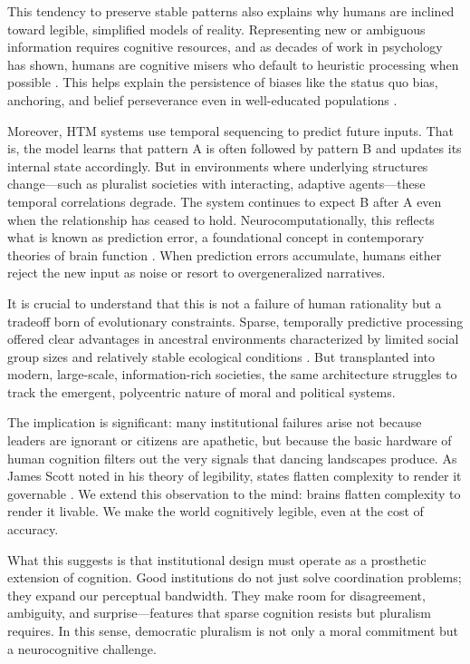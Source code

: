 \documentclass[12pt]{article}  %
\begin{document}
This tendency to preserve stable patterns also explains why humans are inclined toward legible, simplified models of reality. Representing new or ambiguous information requires cognitive resources, and as decades of work in psychology has shown, humans are cognitive misers who default to heuristic processing when possible \parencite{kahneman2011thinking, stanovich2000individual}. This helps explain the persistence of biases like the status quo bias, anchoring, and belief perseverance even in well-educated populations \parencite{samuelson1988status, nickerson1998confirmation}.

Moreover, HTM systems use temporal sequencing to predict future inputs. That is, the model learns that pattern A is often followed by pattern B and updates its internal state accordingly. But in environments where underlying structures change—such as pluralist societies with interacting, adaptive agents—these temporal correlations degrade. The system continues to expect B after A even when the relationship has ceased to hold. Neurocomputationally, this reflects what is known as prediction error, a foundational concept in contemporary theories of brain function \parencite{friston2009predictive, clark2013whatever}. When prediction errors accumulate, humans either reject the new input as noise or resort to overgeneralized narratives.

It is crucial to understand that this is not a failure of human rationality but a tradeoff born of evolutionary constraints. Sparse, temporally predictive processing offered clear advantages in ancestral environments characterized by limited social group sizes and relatively stable ecological conditions \parencite{dunbar1992neocortex}. But transplanted into modern, large-scale, information-rich societies, the same architecture struggles to track the emergent, polycentric nature of moral and political systems.

The implication is significant: many institutional failures arise not because leaders are ignorant or citizens are apathetic, but because the basic hardware of human cognition filters out the very signals that dancing landscapes produce. As James Scott noted in his theory of legibility, states flatten complexity to render it governable \parencite{scott1998seeing}. We extend this observation to the mind: brains flatten complexity to render it livable. We make the world cognitively legible, even at the cost of accuracy.

What this suggests is that institutional design must operate as a prosthetic extension of cognition. Good institutions do not just solve coordination problems; they expand our perceptual bandwidth. They make room for disagreement, ambiguity, and surprise—features that sparse cognition resists but pluralism requires. In this sense, democratic pluralism is not only a moral commitment but a neurocognitive challenge.
\end{document}
